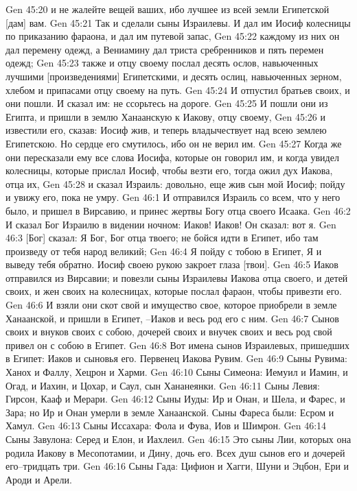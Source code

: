 Gen 45:20  и не жалейте вещей ваших, ибо лучшее из всей земли Египетской [дам] вам.
Gen 45:21  Так и сделали сыны Израилевы. И дал им Иосиф колесницы по приказанию фараона, и дал им путевой запас,
Gen 45:22  каждому из них он дал перемену одежд, а Вениамину дал триста сребренников и пять перемен одежд;
Gen 45:23  также и отцу своему послал десять ослов, навьюченных лучшими [произведениями] Египетскими, и десять ослиц, навьюченных зерном, хлебом и припасами отцу своему на путь.
Gen 45:24  И отпустил братьев своих, и они пошли. И сказал им: не ссорьтесь на дороге.
Gen 45:25  И пошли они из Египта, и пришли в землю Ханаанскую к Иакову, отцу своему,
Gen 45:26  и известили его, сказав: Иосиф жив, и теперь владычествует над всею землею Египетскою. Но сердце его смутилось, ибо он не верил им.
Gen 45:27  Когда же они пересказали ему все слова Иосифа, которые он говорил им, и когда увидел колесницы, которые прислал Иосиф, чтобы везти его, тогда ожил дух Иакова, отца их,
Gen 45:28  и сказал Израиль: довольно, еще жив сын мой Иосиф; пойду и увижу его, пока не умру.
Gen 46:1  И отправился Израиль со всем, что у него было, и пришел в Вирсавию, и принес жертвы Богу отца своего Исаака.
Gen 46:2  И сказал Бог Израилю в видении ночном: Иаков! Иаков! Он сказал: вот я.
Gen 46:3  [Бог] сказал: Я Бог, Бог отца твоего; не бойся идти в Египет, ибо там произведу от тебя народ великий;
Gen 46:4  Я пойду с тобою в Египет, Я и выведу тебя обратно. Иосиф своею рукою закроет глаза [твои].
Gen 46:5  Иаков отправился из Вирсавии; и повезли сыны Израилевы Иакова отца своего, и детей своих, и жен своих на колесницах, которые послал фараон, чтобы привезти его.
Gen 46:6  И взяли они скот свой и имущество свое, которое приобрели в земле Ханаанской, и пришли в Египет, --Иаков и весь род его с ним.
Gen 46:7  Сынов своих и внуков своих с собою, дочерей своих и внучек своих и весь род свой привел он с собою в Египет.
Gen 46:8  Вот имена сынов Израилевых, пришедших в Египет: Иаков и сыновья его. Первенец Иакова Рувим.
Gen 46:9  Сыны Рувима: Ханох и Фаллу, Хецрон и Харми.
Gen 46:10  Сыны Симеона: Иемуил и Иамин, и Огад, и Иахин, и Цохар, и Саул, сын Хананеянки.
Gen 46:11  Сыны Левия: Гирсон, Кааф и Мерари.
Gen 46:12  Сыны Иуды: Ир и Онан, и Шела, и Фарес, и Зара; но Ир и Онан умерли в земле Ханаанской. Сыны Фареса были: Есром и Хамул.
Gen 46:13  Сыны Иссахара: Фола и Фува, Иов и Шимрон.
Gen 46:14  Сыны Завулона: Серед и Елон, и Иахлеил.
Gen 46:15  Это сыны Лии, которых она родила Иакову в Месопотамии, и Дину, дочь его. Всех душ сынов его и дочерей его--тридцать три.
Gen 46:16  Сыны Гада: Цифион и Хагги, Шуни и Эцбон, Ери и Ароди и Арели.
